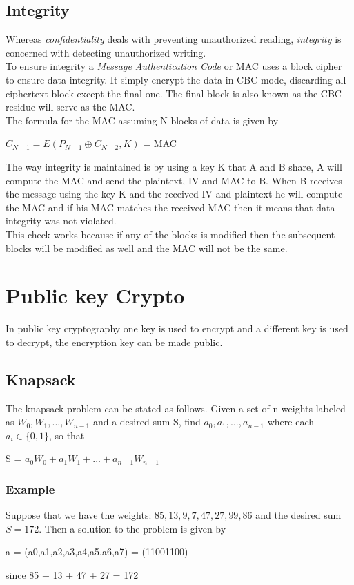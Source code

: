 \documentclass{article}
\begin{document}
\subsection{Integrity}
Whereas \textit{confidentiality} deals with preventing unauthorized reading, \textit{integrity} is concerned with detecting unauthorized writing.\\
To ensure integrity a \textit{Message Authentication Code} or MAC uses a block cipher to ensure data integrity. It simply encrypt the data in CBC mode, discarding all ciphertext block except the final one. The final block is also known as the CBC residue will serve as the MAC.\\
The formula for the MAC assuming N blocks of data is given by
\begin{center}
    $C_{N-1} = E(P_{N-1} \oplus C_{N-2},K)$ = MAC
\end{center}
The way integrity is maintained is by using a key K that A and B share, A will compute the MAC and send the plaintext, IV and MAC to B. When B receives the message using the key K and the received IV and plaintext he will compute the MAC and if his MAC matches the received MAC then it means that data integrity was not violated.\\
This check works because if any of the blocks is modified then the subsequent blocks will be modified as well and the MAC will not be the same.

\newpage
\section{Public key Crypto}
In public key cryptography one key is used to encrypt and a different key is used to decrypt, the encryption key can be made public.

\subsection{Knapsack}
The knapsack problem can be stated as follows. Given a set of n weights labeled as $W_0,W_1,...,W_{n-1}$ and a desired sum S, find $a_0,a_1,...,a_{n-1}$ where each $a_i \in \{0,1\}$, so that
\begin{center}
    S = $a_0W_0 + a_1W_1 + ... + a_{n-1}W_{n-1}$
\end{center}{}

\subsubsection{Example}
Suppose that we have the weights: $85,13,9,7,47,27,99,86$ and the desired sum $S = 172$. Then a solution to the problem is given by
\begin{center}
    a = (a0,a1,a2,a3,a4,a5,a6,a7) = (11001100)
\end{center}{}
since 85 + 13 + 47 + 27 = 172
\end{document}
